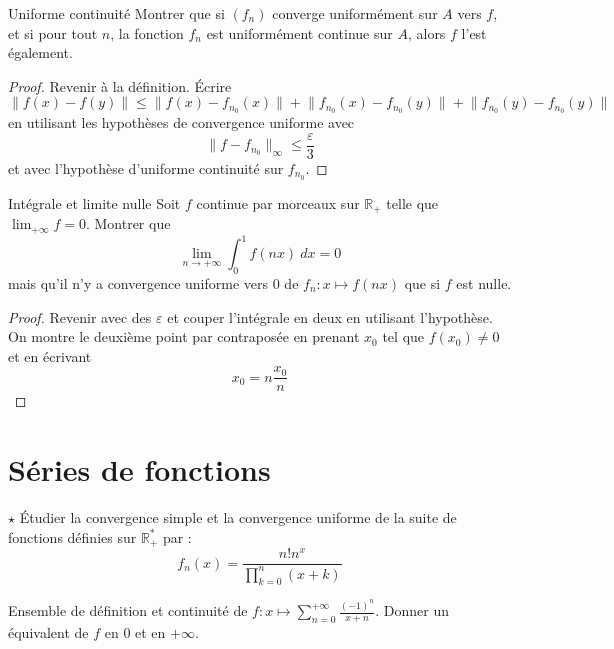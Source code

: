 \documentclass[french,a4paper]{article}
\newcommand{\R}{\mathbb{R}}
\newcommand{\st}{^*}
\theoremstyle{plain}
\theoremstyle{definition}
\theoremstyle{remark}
\begin{document}
\begin{ex}{Uniforme continuité}
	Montrer que si $(f_n)$ converge uniformément sur $A$ vers $f$, et si pour tout $n$, la fonction $f_n$ est uniformément continue sur $A$, alors $f$ l'est également.
\end{ex}
\begin{proof}
	Revenir à la définition. Écrire $$\lVert f(x)-f(y)\rVert\leqslant\lVert f(x)-f_{n_0}(x)\rVert+\lVert f_{n_0}(x)-f_{n_0}(y)\rVert+\lVert f_{n_0}(y)-f_{n_0}(y)\rVert$$ en utilisant les hypothèses de convergence uniforme avec $$\lVert f-f_{n_0}\rVert_\infty\leqslant\frac{\varepsilon}{3}$$ et avec l'hypothèse d'uniforme continuité sur $f_{n_0}$. 
\end{proof}

\begin{ex}{Intégrale et limite nulle}
	Soit $f$ continue par morceaux sur $\R_+$ telle que $\lim_{+\infty}f=0$. Montrer que $$\lim_{n\to+\infty}\int_{0}^{1}f(nx)\ dx=0$$ mais qu'il n'y a convergence uniforme vers $0$ de $f_n:x\mapsto f(nx)$ que si $f$ est nulle.
\end{ex}
\begin{proof}
	Revenir avec des $\varepsilon$ et couper l'intégrale en deux en utilisant l'hypothèse. On montre le deuxième point par contraposée en prenant $x_0$ tel que $f(x_0)\ne 0$ et en écrivant $$x_0=n\frac{x_0}{n}$$
\end{proof}

\section{Séries de fonctions}

\begin{ex}{$\star$}
	Étudier la convergence simple et la convergence uniforme de la suite de fonctions définies sur $\R_+\st$ par : $$f_n(x)=\frac{n!n^x}{\prod_{k=0}^{n}(x+k)}$$
\end{ex}

\begin{ex}{}
	Ensemble de définition et continuité de $f:x\mapsto\displaystyle\sum_{n=0}^{+\infty}\frac{(-1)^n}{x+n}$. Donner un équivalent de $f$ en $0$ et en $+\infty$.
\end{ex}
\end{document}
